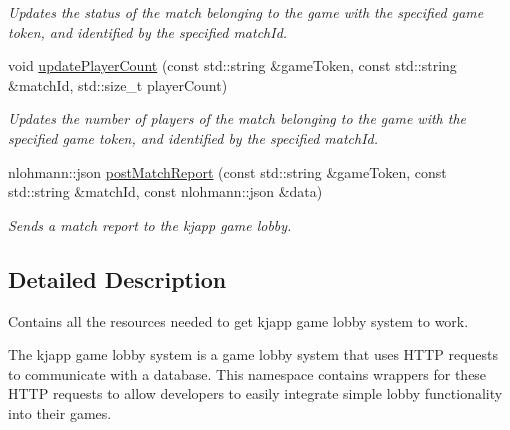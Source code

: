 \begin{DoxyCompactItemize}
\begin{DoxyCompactList}\small\item\em Updates the status of the match belonging to the game with the specified game token, and identified by the specified match\+Id. \end{DoxyCompactList}\item 
void \hyperlink{namespacekjapp_ae7b42c3ae999b0f34c20202585ce7791}{update\+Player\+Count} (const std\+::string \&game\+Token, const std\+::string \&match\+Id, std\+::size\+\_\+t player\+Count)
\begin{DoxyCompactList}\small\item\em Updates the number of players of the match belonging to the game with the specified game token, and identified by the specified match\+Id. \end{DoxyCompactList}\item 
nlohmann\+::json \hyperlink{namespacekjapp_a1967229dd0630020ab4e19cab9b09d74}{post\+Match\+Report} (const std\+::string \&game\+Token, const std\+::string \&match\+Id, const nlohmann\+::json \&data)
\begin{DoxyCompactList}\small\item\em Sends a match report to the kjapp game lobby. \end{DoxyCompactList}\end{DoxyCompactItemize}


\subsection{Detailed Description}
Contains all the resources needed to get kjapp game lobby system to work. 

The kjapp game lobby system is a game lobby system that uses H\+T\+TP requests to communicate with a database. This namespace contains wrappers for these H\+T\+TP requests to allow developers to easily integrate simple lobby functionality into their games.

